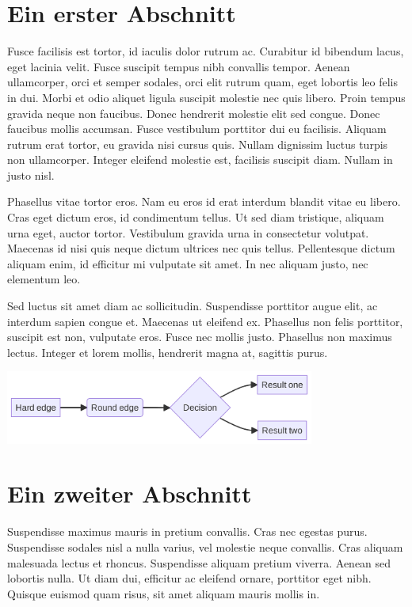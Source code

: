 \documentclass[
  12pt,
  a4paperpaper,
  a4paper]{scrreprt}
\begin{document}
\section{Ein erster Abschnitt}\label{ein-erster-abschnitt-1}

Fusce facilisis est tortor, id iaculis dolor rutrum ac. Curabitur id
bibendum lacus, eget lacinia velit. Fusce suscipit tempus nibh convallis
tempor. Aenean ullamcorper, orci et semper sodales, orci elit rutrum
quam, eget lobortis leo felis in dui. Morbi et odio aliquet ligula
suscipit molestie nec quis libero. Proin tempus gravida neque non
faucibus. Donec hendrerit molestie elit sed congue. Donec faucibus
mollis accumsan. Fusce vestibulum porttitor dui eu facilisis. Aliquam
rutrum erat tortor, eu gravida nisi cursus quis. Nullam dignissim luctus
turpis non ullamcorper. Integer eleifend molestie est, facilisis
suscipit diam. Nullam in justo nisl.

Phasellus vitae tortor eros. Nam eu eros id erat interdum blandit vitae
eu libero. Cras eget dictum eros, id condimentum tellus. Ut sed diam
tristique, aliquam urna eget, auctor tortor. Vestibulum gravida urna in
consectetur volutpat. Maecenas id nisi quis neque dictum ultrices nec
quis tellus. Pellentesque dictum aliquam enim, id efficitur mi vulputate
sit amet. In nec aliquam justo, nec elementum leo.

Sed luctus sit amet diam ac sollicitudin. Suspendisse porttitor augue
elit, ac interdum sapien congue et. Maecenas ut eleifend ex. Phasellus
non felis porttitor, suscipit est non, vulputate eros. Fusce nec mollis
justo. Phasellus non maximus lectus. Integer et lorem mollis, hendrerit
magna at, sagittis purus.

\includegraphics[width=4in,height=0.95in]{appendices/01-test_files/figure-latex/mermaid-figure-1.png}

\section{Ein zweiter Abschnitt}\label{ein-zweiter-abschnitt-1}

Suspendisse maximus mauris in pretium convallis. Cras nec egestas purus.
Suspendisse sodales nisl a nulla varius, vel molestie neque convallis.
Cras aliquam malesuada lectus et rhoncus. Suspendisse aliquam pretium
viverra. Aenean sed lobortis nulla. Ut diam dui, efficitur ac eleifend
ornare, porttitor eget nibh. Quisque euismod quam risus, sit amet
aliquam mauris mollis in.
\end{document}
